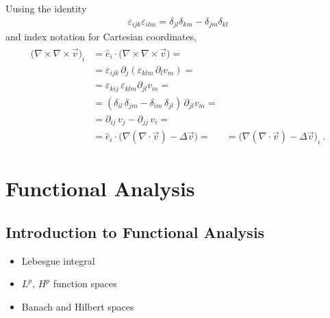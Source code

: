\documentclass[letterpaper,10pt,english]{jupyterBook}
\begin{document}
\sphinxAtStartPar
Uusing the identity
\begin{equation*}
\begin{split}\varepsilon_{ijk} \varepsilon_{ilm} = \delta_{jl} \delta_{km} - \delta_{jm} \delta_{kl}\end{split}
\end{equation*}
\sphinxAtStartPar
and index notation for Cartesian coordinates,
\begin{equation*}
\begin{split}\begin{aligned}
 \big( \nabla \times \nabla \times \vec{v} \big)_i 
 & = \hat{e}_i \cdot \big( \nabla \times \nabla \times \vec{v} \big) = \\
 & = \varepsilon_{ijk} \, \partial_j ( \varepsilon_{klm} \, \partial_l v_m ) = \\
 & = \varepsilon_{kij} \, \varepsilon_{klm} \partial_{jl} v_m = \\
 & = ( \delta_{il} \, \delta_{jm} - \delta_{im} \, \delta_{jl} ) \, \partial_{jl} v_m = \\
 & = \partial_{ij} \, v_j - \partial_{jj} \, v_i = \\
 & = \hat{e}_i \cdot \big( \nabla (\nabla \cdot \vec{v}) - \Delta \vec{v} \big) = 
 & = \big( \nabla (\nabla \cdot \vec{v}) - \Delta \vec{v} \big)_i \ .
\end{aligned}\end{split}
\end{equation*}
\sphinxstepscope


\part{Functional Analysis}

\sphinxstepscope


\chapter{Introduction to Functional Analysis}
\label{\detokenize{ch/functional-analysis/intro:introduction-to-functional-analysis}}\label{\detokenize{ch/functional-analysis/intro:functional-analysis}}\label{\detokenize{ch/functional-analysis/intro::doc}}\begin{itemize}
\item {} 
\sphinxAtStartPar
Lebesgue integral

\item {} 
\sphinxAtStartPar
\(L^p\), \(H^p\) function spaces

\item {} 
\sphinxAtStartPar
Banach and Hilbert spaces

\end{itemize}
\end{document}

